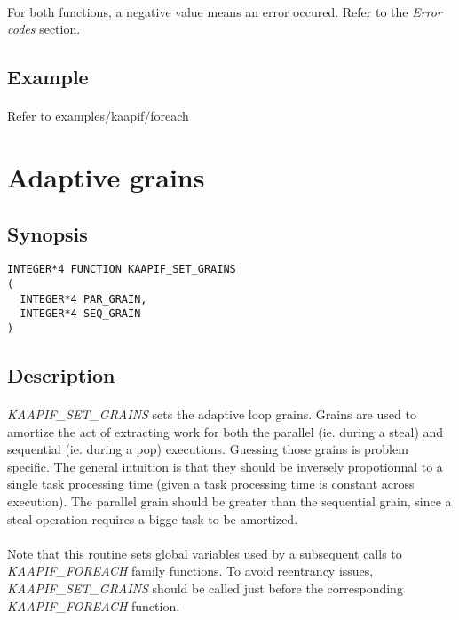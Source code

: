 \documentclass[a4paper, 11pt]{article}
\begin{document}
\paragraph{}
For both functions, a negative value means an error occured. Refer to the
\textit{Error codes} section.

\subsection{Example}
\paragraph{}
Refer to examples/kaapif/foreach


\newpage
\section{Adaptive grains}

\subsection{Synopsis}
\begin{small}
\lstset{language=C}
\begin{lstlisting}[frame=tb]
INTEGER*4 FUNCTION KAAPIF_SET_GRAINS
(
  INTEGER*4 PAR_GRAIN,
  INTEGER*4 SEQ_GRAIN
)
\end{lstlisting}
\end{small}

\subsection{Description}
\paragraph{}
\textit{KAAPIF\_SET\_GRAINS} sets the adaptive loop grains. Grains are used
to amortize the act of extracting work for both the parallel (ie. during a
steal) and sequential (ie. during a pop) executions. Guessing those grains
is problem specific. The general intuition is that they should be inversely
propotionnal to a single task processing time (given a task processing time
is constant across execution). The parallel grain should be greater than the
sequential grain, since a steal operation requires a bigge task to be amortized.

\paragraph{}
Note that this routine sets global variables used by a subsequent calls to
\textit{KAAPIF\_FOREACH} family functions. To avoid reentrancy issues,
\textit{KAAPIF\_SET\_GRAINS} should be called just before the corresponding
\textit{KAAPIF\_FOREACH} function.
\end{document}

